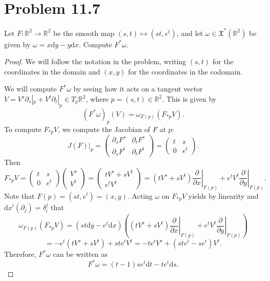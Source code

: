 \documentclass[11pt, letterpaper]{article}
\begin{document}
\section{Problem 11.7}
\begin{problem}
	Let $F : \mathbb{R} ^2 \to \mathbb{R} ^2$ be the smooth map $(s,t)\mapsto (st,e^t)$, and let $\omega \in \mathfrak{X} ^*(\mathbb{R} ^2)$ be given by $\omega =x \mathrm{d} y-y\mathrm{d} x$. Compute $F^*\omega $.
\end{problem}
\begin{proof}
	We will follow the notation in the problem, writing $(s,t)$ for the coordinates in the domain and $(x,y)$ for the coordinates in the codomain.

	We will compute $F^*\omega $ by seeing how it acts on a tangent vector $V=V^s \partial _s|_p + V^t \partial _t|_p\in T_p\mathbb{R} ^2$, where $p=(s,t)\in\mathbb{R} ^2$. This is given by
	\[
		(F^*\omega )_p(V)=\omega_{F(p)} (F_{*p} V)
	.\]
	To compute $F_{*p} V$, we compute the Jacobian of $F$ at $p$:
	\[
		J(F)|_p=\begin{pmatrix}
			\partial_sF^s & \partial _tF^s \\
		\partial _sF^t & \partial _tF^t
		\end{pmatrix}=\begin{pmatrix}
		t & s \\
		0 & e^t
		\end{pmatrix}
	.\]
	Then
	\[
		F_{*p} V = \begin{pmatrix}
		t & s \\
		0 & e^t
		\end{pmatrix}\begin{pmatrix}
		V^s \\
		V^t
		\end{pmatrix}=\begin{pmatrix}
		tV^s+sV^t \\
		e^tV^t
		\end{pmatrix} = \left( tV^s+sV^t \right) \left.\frac{\partial }{\partial x} \right|_{F(p)} +e^tV^t \left. \frac{\partial }{\partial y} \right|_{F(p)}
	.\]
	Note that $F(p)=(st,e^t)=(x,y)$. Acting $\omega $ on $F_{*p} V$ yields by linearity and $\mathrm{d} x^i(\partial _j)=\delta_i^j$ that
	\[
		\omega_{F(p)} (F_{*p} V)=\left( st\mathrm{d} y-e^t \mathrm{d} x \right) \left( \left( tV^s+sV^t \right) \left.\frac{\partial }{\partial x} \right|_{F(p)} +e^tV^t \left. \frac{\partial }{\partial y} \right|_{F(p)} \right) 
	\]
	\[
		=-e^t\left( tV^s+sV^t \right) +ste^tV^t = -t e^tV^s + \left( ste^t-se^t \right) V^t
	.\]
	Therefore, $F^*\omega $ can be written as
	\[
		F^*\omega =\left( t-1 \right) se^t\mathrm{d} t-te^t \mathrm{d} s
	.\]
	
\end{proof}
\end{document}
